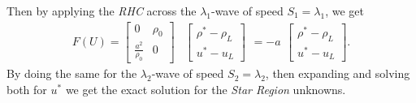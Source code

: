 \documentclass[]{article}
\begin{document}
		Then by applying the \textit{RHC} across the $ \lambda_1 $-wave of speed $ S_1 = \lambda_1 $, we get
		\begin{equation}						
		\begin{aligned}
		F(U) = \left[
		\begin{array}{ll}
		0 & \rho_0\\
		\frac{a^2}{\rho_0} & 0 
		\end{array}
		\right]
		\end{aligned}
		\begin{aligned}
		\left[
		\begin{array}{ll}
		\rho^*-\rho_L \\
		u^* - u_L
		\end{array}
		\right]
		\end{aligned} =
		-a			
		\begin{aligned}
		\left[
		\begin{array}{ll}
		\rho^*-\rho_L \\
		u^* - u_L
		\end{array}
		\right].
		\end{aligned}
		\end{equation}
		By doing the same for the $ \lambda_2 $-wave of speed $ S_2 = \lambda_2 $, then expanding and solving both for $ u^* $ we get the exact solution for the \textit{Star Region} unknowns.
		
\end{document}
